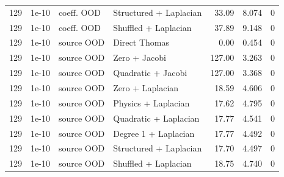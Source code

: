 \begin{longtable}{rlllrrr}
129 & 1e-10 & coeff. OOD & Structured + Laplacian & 33.09 & 8.074 & 0 \\
129 & 1e-10 & coeff. OOD & Shuffled + Laplacian & 37.89 & 9.148 & 0 \\
129 & 1e-10 & source OOD & Direct Thomas & 0.00 & 0.454 & 0 \\
129 & 1e-10 & source OOD & Zero + Jacobi & 127.00 & 3.263 & 0 \\
129 & 1e-10 & source OOD & Quadratic + Jacobi & 127.00 & 3.368 & 0 \\
129 & 1e-10 & source OOD & Zero + Laplacian & 18.59 & 4.606 & 0 \\
129 & 1e-10 & source OOD & Physics + Laplacian & 17.62 & 4.795 & 0 \\
129 & 1e-10 & source OOD & Quadratic + Laplacian & 17.77 & 4.541 & 0 \\
129 & 1e-10 & source OOD & Degree 1 + Laplacian & 17.77 & 4.492 & 0 \\
129 & 1e-10 & source OOD & Structured + Laplacian & 17.70 & 4.497 & 0 \\
129 & 1e-10 & source OOD & Shuffled + Laplacian & 18.75 & 4.740 & 0 \\
\bottomrule\end{longtable}
\normalsize
